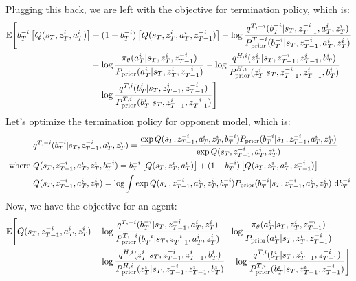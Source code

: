 Plugging this back, we are left with the objective for termination policy, which is:
\begin{equation}
\begin{aligned}
    \mathbb{E}\Bigg[b^{-i}_T\left[ Q(s_T, z^i_T, a^{i}_T) \right] &+ (1-b^{-i}_T)\left[ Q(s_T, z^i_T, a^{i}_T, z^{-i}_{T-1}) \right] - \log\frac{q^{T,-i}(b^{-i}_T | s_T,  z^{-i}_{T-1}, a^i_T, z^i_T)}{P^{T,-i}_{\text{prior}}(b^{-i}_T | s_T,  z^{-i}_{T-1}, a^i_T, z^i_T)} \\
    &- \log\frac{\pi_\theta(a^i_T | s_T, z^i_T, z^{-i}_{T-1})}{P_{\text{prior}}(a^i_T | s_T, z^i_T, z^{-i}_{T-1})} - \log\frac{q^{H, i}(z^i_T | s_T, z^{-i}_{T-1}, z^i_{T-1}, b^i_T)}{P^{H, i}_{\text{prior}}(z^i_T | s_T, z^{-i}_{T-1}, z^i_{T-1}, b^i_T)}\\
    &- \log\frac{q^{T,i}(b^i_T | s_T, z^i_{T-1}, z^{-i}_{T-1})}{P^{T,i}_{\text{prior}}(b^i_T | s_T, z^i_{T-1}, z^{-i}_{T-1})}\Bigg]
\end{aligned}
\end{equation}
Let's optimize the termination policy for opponent model, which is:
\begin{equation}
\begin{aligned}
    &q^{T,-i}(b^{-i}_T | s_T,  z^{-i}_{T-1}, a^i_T, z^i_T) = \frac{\exp Q(s_T,  z^{-i}_{T-1}, a^i_T, z^i_T, b^{-i}_T) P_{\text{prior}}(b^{-i}_T | s_T,  z^{-i}_{T-1}, a^i_T, z^i_T)}{\exp Q(s_T,  z^{-i}_{T-1}, a^i_T, z^i_T)} \\
    \text{ where }&Q(s_T,  z^{-i}_{T-1}, a^i_T, z^i_T, b^{-i}_T) = b^{-i}_T\left[ Q(s_T, z^i_T, a^{i}_T) \right] + (1-b^{-i}_T)\left[ Q(s_T, z^i_T, a^{i}_T, z^{-i}_{T-1}) \right] \\
    &Q(s_T,  z^{-i}_{T-1}, a^i_T, z^i_T) = \log \int \exp Q(s_T,  z^{-i}_{T-1}, a^i_T, z^i_T, b^{-i}_T) P_{\text{prior}}(b^{-i}_T | s_T,  z^{-i}_{T-1}, a^i_T, z^i_T) \ \mathrm{d} b^{-i}_T
\end{aligned}
\end{equation}
Now, we have the objective for an agent:
\begin{equation}
\begin{aligned}
    \mathbb{E}\Bigg[Q(s_T,  z^{-i}_{T-1}, a^i_T, z^i_T) &- \log\frac{q^{T,-i}(b^{-i}_T | s_T,  z^{-i}_{T-1}, a^i_T, z^i_T)}{P^{T,-i}_{\text{prior}}(b^{-i}_T | s_T,  z^{-i}_{T-1}, a^i_T, z^i_T)} - \log\frac{\pi_\theta(a^i_T | s_T, z^i_T, z^{-i}_{T-1})}{P_{\text{prior}}(a^i_T | s_T, z^i_T, z^{-i}_{T-1})} \\
    &- \log\frac{q^{H, i}(z^i_T | s_T, z^{-i}_{T-1}, z^i_{T-1}, b^i_T)}{P^{H, i}_{\text{prior}}(z^i_T | s_T, z^{-i}_{T-1}, z^i_{T-1}, b^i_T)}
    - \log\frac{q^{T,i}(b^i_T | s_T, z^i_{T-1}, z^{-i}_{T-1})}{P^{T,i}_{\text{prior}}(b^i_T | s_T, z^i_{T-1}, z^{-i}_{T-1})}\Bigg]
\end{aligned}
\end{equation}

